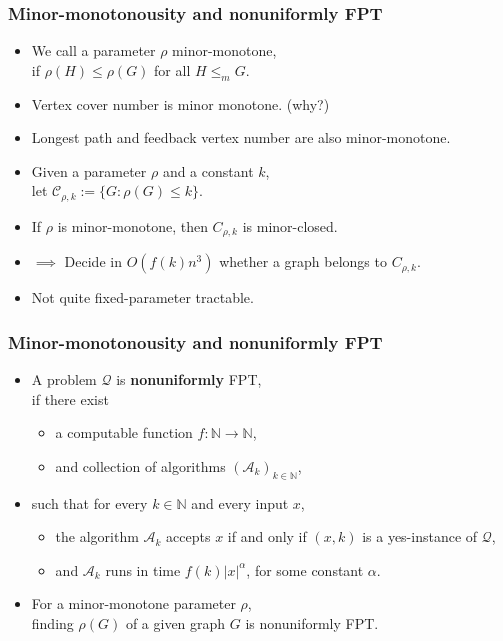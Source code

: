 \documentclass[t,usenames,dvipsnames]{beamer}
\begin{document}
\begin{frame} \frametitle{Minor-monotonousity and nonuniformly FPT}
	\begin{itemize}[<+->]
		\item We call a parameter $\rho$ minor-monotone,\\
			\hspace{1cm}if $\rho(H)\leq \rho(G)$ for all $H \leq_m G$.
		\item Vertex cover number is minor monotone. (why?)
		\item Longest path and feedback vertex number are also minor-monotone.
		\item Given a parameter $\rho$ and a constant $k$,\\
		\hspace{1cm}let $\mathcal{C}_{\rho, k} := \{G \colon \rho(G) \leq k\}$.
		\item If $\rho$ is minor-monotone, then $C_{\rho, k}$ is minor-closed.
		\item[] $\implies$ Decide in $O(f(k) n^3)$ whether a graph belongs to $C_{\rho, k}$.
		\item Not quite fixed-parameter tractable.
	\end{itemize}
\end{frame}
\begin{frame} \frametitle{Minor-monotonousity and nonuniformly FPT}
	\begin{itemize}[<+->]
		\item A problem $\mathcal{Q}$ is \textbf{nonuniformly} FPT,\\
			\hspace{1cm}if there exist
			\begin{itemize}
				\item a computable function $f:\mathbb{N}\rightarrow\mathbb{N}$,
				\item and collection of algorithms $(\mathcal{A}_k)_{k \in
					\mathbb{N}}$,
			\end{itemize}
		\item[] such that for every $k \in \mathbb{N}$ and every input $x$, 
		\begin{itemize}[<+->]
			\item the algorithm $\mathcal{A}_k$ accepts $x$ if and only if $(x,
				k)$ is a yes-instance of $\mathcal{Q}$,
			\item and $\mathcal{A}_k$ runs in time $f(k)|x|^{\alpha}$, for some constant
				$\alpha$.
		\end{itemize}
	\item For a minor-monotone parameter $\rho$,\\
		\hspace{1cm}finding $\rho(G)$ of a given graph $G$ is nonuniformly FPT.
	\end{itemize}
	
\end{frame}
\end{document}
